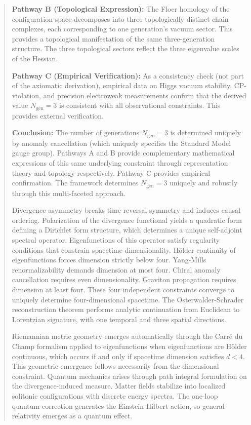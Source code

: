 \begin{abstract}
\textbf{Pathway B (Topological Expression):} The Floer homology of the configuration space decomposes into three topologically distinct chain complexes, each corresponding to one generation's vacuum sector. This provides a topological manifestation of the same three-generation structure. The three topological sectors reflect the three eigenvalue scales of the Hessian.

\textbf{Pathway C (Empirical Verification):} As a consistency check (not part of the axiomatic derivation), empirical data on Higgs vacuum stability, CP-violation, and precision electroweak measurements confirm that the derived value $N_{\text{gen}} = 3$ is consistent with all observational constraints. This provides external verification.

\textbf{Conclusion:} The number of generations $N_{\text{gen}} = 3$ is determined uniquely by anomaly cancellation (which uniquely specifies the Standard Model gauge group). Pathways A and B provide complementary mathematical expressions of this same underlying constraint through representation theory and topology respectively. Pathway C provides empirical confirmation. The framework determines $N_{\text{gen}} = 3$ uniquely and robustly through this multi-faceted approach.

Divergence asymmetry breaks time-reversal symmetry and induces causal ordering. Polarization of the divergence functional yields a quadratic form defining a Dirichlet form structure, which determines a unique self-adjoint spectral operator. Eigenfunctions of this operator satisfy regularity conditions that constrain spacetime dimensionality. Hölder continuity of eigenfunctions forces dimension strictly below four. Yang-Mills renormalizability demands dimension at most four. Chiral anomaly cancellation requires even dimensionality. Graviton propagation requires dimension at least four. These four independent constraints converge to uniquely determine four-dimensional spacetime. The Osterwalder-Schrader reconstruction theorem performs analytic continuation from Euclidean to Lorentzian signature, with one temporal and three spatial directions.

Riemannian metric geometry emerges automatically through the Carré du Champ formalism applied to eigenfunctions when eigenfunctions are Hölder continuous, which occurs if and only if spacetime dimension satisfies $d < 4$. This geometric emergence follows necessarily from the dimensional constraint. Quantum mechanics arises through path integral formulation on the divergence-induced measure. Matter fields stabilize into localized solitonic configurations with discrete energy spectra. The one-loop quantum correction generates the Einstein-Hilbert action, so general relativity emerges as a quantum effect.


\end{abstract}

